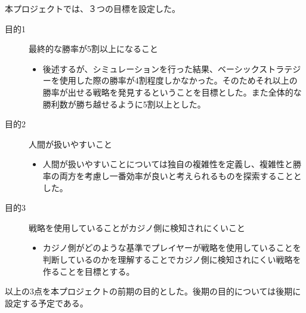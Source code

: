 本プロジェクトでは、３つの目標を設定した。
\begin{description}
\item[目的1] 最終的な勝率が5割以上になること
\begin{itemize}
\item{後述するが、シミュレーションを行った結果、ベーシックストラテジーを使用した際の勝率が4割程度しかなかった。そのためそれ以上の勝率が出せる戦略を発見するということを目標とした。また全体的な勝利数が勝ち越せるように5割以上とした。}
\end{itemize}
\item[目的2]人間が扱いやすいこと
\begin{itemize}
\item{人間が扱いやすいことについては独自の複雑性を定義し、複雑性と勝率の両方を考慮し一番効率が良いと考えられるものを探索することとした。}
\end{itemize}
\item[目的3]戦略を使用していることがカジノ側に検知されにくいこと
\begin{itemize}
\item{カジノ側がどのような基準でプレイヤーが戦略を使用していることを判断しているのかを理解することでカジノ側に検知されにくい戦略を作ることを目標とする。}
\end{itemize}
\end{description}
以上の3点を本プロジェクトの前期の目的とした。後期の目的については後期に設定する予定である。
